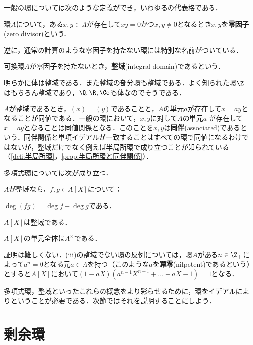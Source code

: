 一般の環については次のような定義ができ，いわゆるの代表格である．

\begin{defi}[零因子]
	環$A$について，ある$x,y\in A$が存在して$xy=0$かつ$x,y\neq0$となるとき$x,y$を\textbf{零因子}(zero divisor)という．
\end{defi}

逆に，通常の計算のような零因子を持たない環には特別な名前がついている．

\begin{defi}[整域]
	可換環$A$が零因子を持たないとき，\textbf{整域}(integral domain)であるという．
\end{defi}

明らかに体は整域である．また整域の部分環も整域である．よく知られた環$\Z$はもちろん整域であり，$\Q,\R,\Co$も体なのでそうである．

$A$が整域であるとき，$(x)=(y)$であることと，$A$の単元$a$が存在して$x=ay$となることが同値である．一般の環において，$x,y$に対して$A$の単元$a$
が存在して$x=ay$となることは同値関係となる．このことを$x,y$は\textbf{同伴}(associated)であるという．同伴関係と単項イデアルが一致することはすべての環で同値になるわけではないが，整域だけでなく例えば半局所環で成り立つことが知られている（\ref{defi:半局所環}，\ref{prop:半局所環と同伴関係}）．

多項式環については次が成り立つ．

\begin{prop}
	$A$が整域なら，$f,g\in A[X]$について；
	\begin{sakura}
		\item $\deg(fg)=\deg f+\deg g$である．
		\item $A[X]$は整域である．
		\item $A[X]$の単元全体は$A^\times$である．
	\end{sakura}
\end{prop}

証明は難しくない．(iii)の整域でない環の反例については，環$A$がある$n\in\Z_+$によって$a^n=0$となる元$a\in A$を持つ（このような$a$を\textbf{冪零}(nilpotent)であるという）とすると$A[X]$において$(1-aX)(a^{n-1}X^{n-1}+\dots+aX-1)=1$となる．

多項式環，整域といったこれらの概念をより彩らせるために，環をイデアルによりということが必要である．次節ではそれを説明することにしよう．

\section{剰余環}

